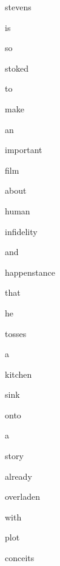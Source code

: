 \documentclass[varwidth]{standalone}
\begin{document}
\begin{CJK*}{UTF8}{gbsn}
{\setlength{\fboxsep}{0pt}\colorbox{white!0}{\parbox{0.8\textwidth}{
\colorbox{red!8.89496}{\strut stevens} \colorbox{red!21.070543}{\strut is} \colorbox{red!34.43888}{\strut so} \colorbox{red!79.42322}{\strut stoked} \colorbox{blue!0.59802437}{\strut to} \colorbox{blue!6.413652}{\strut make} \colorbox{blue!7.321184}{\strut an} \colorbox{red!17.013506}{\strut important} \colorbox{red!5.4424357}{\strut film} \colorbox{red!5.6883454}{\strut about} \colorbox{red!4.2297444}{\strut human} \colorbox{red!3.1939297}{\strut infidelity} \colorbox{red!3.1964746}{\strut and} \colorbox{red!2.932722}{\strut happenstance} \colorbox{red!2.0915747}{\strut that} \colorbox{red!8.665617}{\strut he} \colorbox{blue!3.8415432}{\strut tosses} \colorbox{blue!5.9316406}{\strut a} \colorbox{blue!2.8638859}{\strut kitchen} \colorbox{blue!2.493455}{\strut sink} \colorbox{red!0.16567351}{\strut onto} \colorbox{red!1.3408827}{\strut a} \colorbox{red!4.1934333}{\strut story} \colorbox{red!3.2670782}{\strut already} \colorbox{blue!8.253412}{\strut overladen} \colorbox{blue!0.046456624}{\strut with} \colorbox{blue!1.5586581}{\strut plot} \colorbox{blue!3.07478}{\strut conceits} 
}}}
\end{CJK*}
\end{document}
